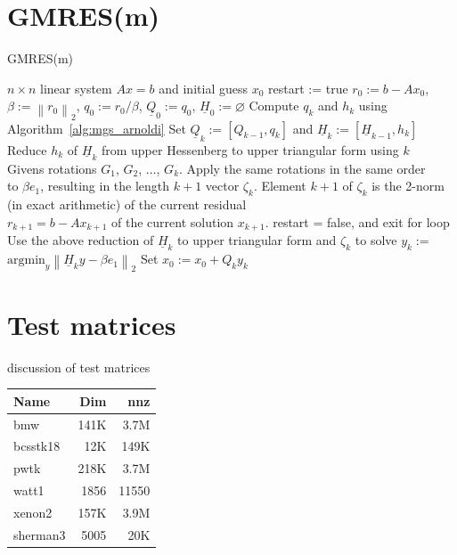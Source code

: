 \documentclass{scrartcl}
\numberwithin{equation}{section}
\newcommand{\norm}[1]{\left\lVert#1\right\rVert}
\begin{document}
\begin{appendices}

\section{GMRES(m)}\label{app:gmres(m)}
\begin{algorithm}
\caption{GMRES(m)}
\label{alg:gmres(m)}
\begin{algorithmic}[1]
    \REQUIRE $n \times n$ linear system $Ax = b$ and initial guess $x_0$
    \STATE restart := true
    	\STATE $r_0:=b - Ax_0$, $\beta := \norm{r_0}_2$, $q_0 := r_0/\beta$, $\underline{Q}_0 := q_0$, $\underline{H}_0 := \varnothing$
			\STATE Compute $q_k$ and $h_k$ using Algorithm~\ref{alg:mgs_arnoldi}
			\STATE Set $\underline{Q}_k := [Q_{k-1},q_k]$ and $\underline{H}_k := [\underline{H}_{k -1}, h_k]$
			\STATE Reduce ${h_k}$ of $\underline{H}_k$ from upper Hessenberg to upper triangular form using $k$ \\
		\hspace{\algorithmicindent} Givens rotations $G_1$, $G_2$, $ \ldots$, $G_{k}$. Apply the same rotations in the same order \\ 
		\hspace{\algorithmicindent} to $\beta e_1$,  resulting in the length $k + 1$ vector $\zeta_{k}$.
			\STATE Element $k + 1$ of $\zeta_k$ is the 2-norm (in exact arithmetic) of the current residual \\
\hspace{\algorithmicindent} $r_{k + 1} = b - Ax_{k + 1}$ of the current solution $x_{k + 1}$.
			\STATE restart = false, and exit for loop		
		\ENDIF
		\ENDFOR
		\STATE Use the above reduction of $\underline{H}_k$ to upper triangular form and $\zeta_k$ to solve $y_k :=$ \\ \hspace{\algorithmicindent} $\text{argmin}_{y} \norm{\underline{H}_k y - \beta e_1}_2$
		\STATE Set $x_0 := x_0 + Q_k y_k$
	\ENDWHILE 
\end{algorithmic}
\end{algorithm}


\section{Test matrices}
discussion of test matrices \\

\begin{tabular}{l|r|r}
Name & Dim & nnz \\
\hline
bmw & 141K & 3.7M \\
bcsstk18 & 12K & 149K \\
pwtk & 218K & 3.7M \\
watt1 & 1856 & 11550 \\
xenon2 & 157K & 3.9M \\
sherman3 & 5005 & 20K \\


\end{tabular}
\end{appendices}
\end{document}
